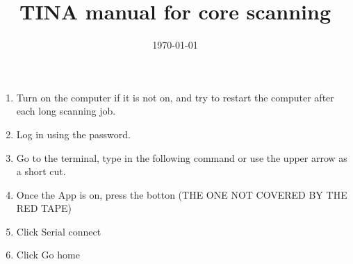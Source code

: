 \documentclass[11pt,letter]{article}
\begin{document}
\title{TINA manual for core scanning} 
\date{\today}
\maketitle

\setlength{\parindent}{0pt}
\setlength{\parskip}{3pt}
\begin{enumerate}
\item Turn on the computer if it is not on, and try to restart the computer after each long scanning job.
\item Log in using the password.
\item Go to the terminal, type in the following command or use the upper arrow as a short cut.
\item Once the App is on, press the botton (THE ONE NOT COVERED BY THE RED TAPE)
\item Click Serial connect
\item Click Go home
	\end{enumerate}
\end{document}
